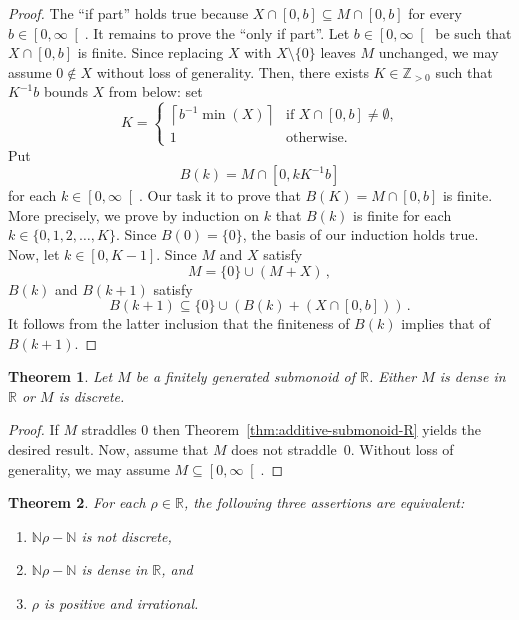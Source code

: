 \documentclass[12pt]{article}
\newcommand{\bZ}{\mathbb{Z}}
\newcommand{\bN}{\mathbb{N}} %
\newcommand{\bNast}{\bZ_{> 0}}
\newcommand{\bR}{\mathbb{R}}
\newcommand{\Rnneg}{\left[0, \infty\right[} %
\newcommand{\ceil}[1]{\left\lceil #1  \right\rceil}
\newtheorem{theorem}{Theorem}
\theoremstyle{definition}
\begin{document}
\begin{proof}
  The ``if part'' holds true because $X \cap [0, b] \subseteq M \cap [0, b]$ for every $b \in \Rnneg$.
  It remains to prove the ``only if part''.
  Let $b \in \Rnneg$ be such that $X \cap [0, b]$ is finite.
  Since replacing $X$ with $X \setminus \{ 0 \}$ leaves $M$ unchanged,  
  we may assume $0 \notin X$ without loss of generality.
  Then, there exists $K \in \bNast$ such that $K^{-1} b$ bounds $X$ from below:
  set
  $$
  K = \begin{cases}
    \ceil{b^{-1} \min (X)} & \text{if   $X \cap [0, b] \ne \emptyset$,} \\
    1 & \text{otherwise.}
  \end{cases}
  $$
  Put
  $$
  B(k) = M \cap \left[0, k K^{-1} b \right]
  $$
  for each $k \in \Rnneg$.
  Our task it to prove that $B(K) = M \cap [0, b]$ is finite.
  More precisely, we prove by induction on $k$ that $B(k)$ is finite for each $k \in \{ 0, 1, 2, \ldots, K \}$.
  Since $B(0) = \{ 0 \}$, the basis of our induction holds true.
  Now, let $k \in [0, K - 1]$.
  Since $M$ and $X$ satisfy
  $$
  M = \{ 0 \} \cup (M + X) \,,
  $$
  $B(k)$ and $B(k + 1)$ satisfy
  $$
  B(k + 1) \subseteq \{ 0 \} \cup \left(  B(k) + \left( X \cap [0, b]  \right) \right) \,.
  $$
  It follows from the latter inclusion that the finiteness of $B(k)$ implies that of $B(k + 1)$.
\end{proof}


\begin{theorem}
  Let $M$ be a finitely generated submonoid of $\bR$.
  Either $M$ is dense in $\bR$ or $M$ is discrete.
\end{theorem}

\begin{proof}
  If $M$ straddles $0$ then Theorem~\ref{thm:additive-submonoid-R} yields the desired result.
  Now, assume that $M$ does not straddle~$0$.
  Without loss of generality, we may assume $M \subseteq \Rnneg$.
  
\end{proof}

 \begin{theorem} \label{thm:Nr-N}
   For each $\rho \in \bR$,
   the following three assertions are equivalent:
     \begin{enumerate}
     \item $\bN \rho - \bN$ is not discrete, \label{ass:Nr-N:discrete}
     \item $\bN \rho - \bN$ is dense in $\bR$, and  \label{ass:Nr-N:dense}
    \item  $\rho$ is positive and irrational. \label{ass:Nr-N:irrational}
    \end{enumerate} 
\end{theorem}
\end{document}
